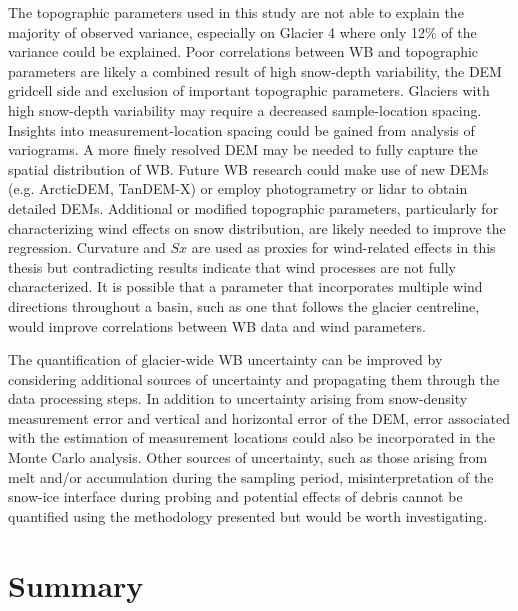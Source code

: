 \documentclass{sfuthesis}
\begin{document}
{The topographic parameters used in this study are not able to explain the majority of observed variance, especially on Glacier 4 where only 12\% of the variance could be explained. Poor correlations between WB and topographic parameters are likely a combined result of high snow-depth variability, the DEM gridcell side and exclusion of important topographic parameters. Glaciers with high snow-depth variability may require a decreased sample-location spacing. Insights into measurement-location spacing could be gained from analysis of variograms. A more finely resolved DEM may be needed to fully capture the spatial distribution of WB. Future WB research could make use of new DEMs (e.g. ArcticDEM, TanDEM-X) or employ photogrametry or lidar to obtain detailed DEMs. Additional or modified topographic parameters, particularly for characterizing wind effects on snow distribution, are likely needed to improve the regression. Curvature and $Sx$ are used as proxies for wind-related effects in this thesis but contradicting results indicate that wind processes are not fully characterized. It is possible that a parameter that incorporates multiple wind directions throughout a basin, such as one that follows the glacier centreline, would improve correlations between WB data and wind parameters. 

The quantification of glacier-wide WB uncertainty can be improved by considering additional sources of uncertainty and propagating them through the data processing steps. In addition to uncertainty arising from snow-density measurement error and vertical and horizontal error of the DEM, error associated with the estimation of measurement locations could also be incorporated in the Monte Carlo analysis. Other sources of uncertainty, such as those arising from melt and/or accumulation during the sampling period, misinterpretation of the snow-ice interface during probing and potential effects of debris cannot be quantified using the methodology presented but would be worth investigating. 

\section{Summary}

}
\end{document}
